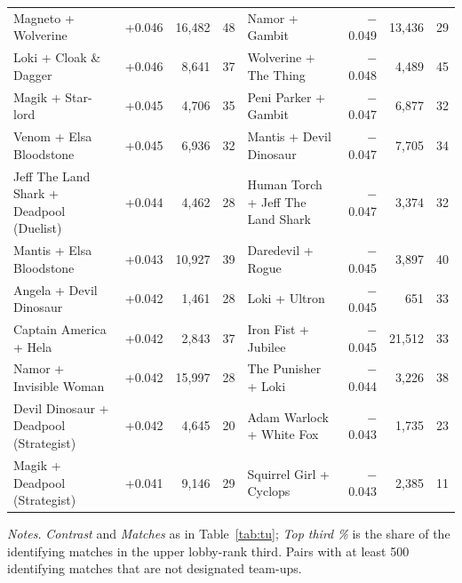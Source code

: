 \documentclass[11pt]{article}
\begin{document}
\begin{landscape}
\begin{center}
{\begin{tabular}{l r r r @{\hspace{2em}} l r r r}
Magneto + Wolverine & +0.046 & 16,482 & 48 & Namor + Gambit & $-$0.049 & 13,436 & 29 \\
Loki + Cloak \& Dagger & +0.046 & 8,641 & 37 & Wolverine + The Thing & $-$0.048 & 4,489 & 45 \\
Magik + Star-lord & +0.045 & 4,706 & 35 & Peni Parker + Gambit & $-$0.047 & 6,877 & 32 \\
Venom + Elsa Bloodstone & +0.045 & 6,936 & 32 & Mantis + Devil Dinosaur & $-$0.047 & 7,705 & 34 \\
Jeff The Land Shark + Deadpool (Duelist) & +0.044 & 4,462 & 28 & Human Torch + Jeff The Land Shark & $-$0.047 & 3,374 & 32 \\
Mantis + Elsa Bloodstone & +0.043 & 10,927 & 39 & Daredevil + Rogue & $-$0.045 & 3,897 & 40 \\
Angela + Devil Dinosaur & +0.042 & 1,461 & 28 & Loki + Ultron & $-$0.045 & 651 & 33 \\
Captain America + Hela & +0.042 & 2,843 & 37 & Iron Fist + Jubilee & $-$0.045 & 21,512 & 33 \\
Namor + Invisible Woman & +0.042 & 15,997 & 28 & The Punisher + Loki & $-$0.044 & 3,226 & 38 \\
Devil Dinosaur + Deadpool (Strategist) & +0.042 & 4,645 & 20 & Adam Warlock + White Fox & $-$0.043 & 1,735 & 23 \\
Magik + Deadpool (Strategist) & +0.041 & 9,146 & 29 & Squirrel Girl + Cyclops & $-$0.043 & 2,385 & 11 \\
\bottomrule
\end{tabular}
}
\end{center}
\vspace{-2pt}
\noindent\begin{minipage}{\linewidth}\footnotesize
\emph{Notes.} \emph{Contrast} and \emph{Matches} as in Table~\ref{tab:tu}; \emph{Top third \%} is the share
of the identifying matches in the upper lobby-rank third. Pairs with at least 500 identifying
matches that are not designated team-ups.
\end{minipage}
\end{landscape}
\end{document}
